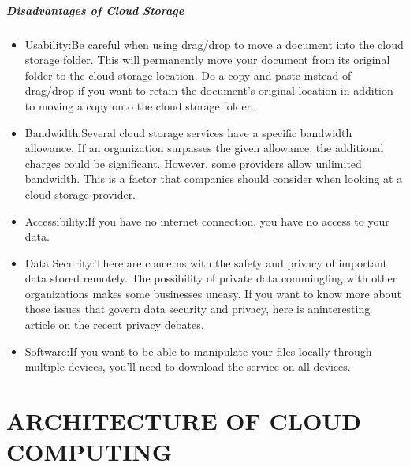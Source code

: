 \documentclass[11pt,a4paper]{report}
\begin{document}
\paragraph{Disadvantages of Cloud Storage}
\begin{itemize}
\item  Usability:Be careful when using drag/drop to move a document into the cloud storage folder. This will permanently move your document from its original folder to the cloud storage location. Do a copy and paste instead of drag/drop if you want to retain the document’s original location in addition to moving a copy onto the cloud storage folder.
\item Bandwidth:Several cloud storage services have a specific bandwidth allowance. If an organization surpasses the given allowance, the additional charges could be significant. However, some providers allow unlimited bandwidth. This is a factor that companies should consider when looking at a cloud storage provider.
\item Accessibility:If you have no internet connection, you have no access to your data.
\item Data Security:There are concerns with the safety and privacy of important data stored remotely. The possibility of private data commingling with other organizations makes some businesses uneasy. If you want to know more about those issues that govern data security and privacy, here is aninteresting article on the recent privacy debates.
\item Software:If you want to be able to manipulate your files locally through multiple devices, you’ll need to download the service on all devices.
\end{itemize}

\chapter{ARCHITECTURE OF CLOUD COMPUTING}
\end{document}
